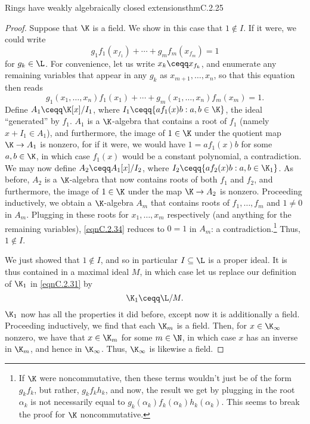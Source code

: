 \begin{thm}{Rings have weakly algebraically closed extensions}{thmC.2.25}
\begin{proof}
		Suppose that $\K$ is a field.  We show in this case that $1\notin I$.  If it were, we could write
		\begin{equation}
			g_1f_1(x_{f_1})+\cdots +g_mf_m(x_{f_m})=1
		\end{equation}
		for $g_k\in \L$.  For convenience, let us write $x_k\ceqq x_{f_k}$, and enumerate any remaining variables that appear in any $g_k$ as $x_{m+1},\ldots ,x_n$, so that this equation then reads
		\begin{equation}\label{eqnC.2.34}
			g_1(x_1,\ldots ,x_n)f_1(x_1)+\cdots +g_m(x_1,\ldots ,x_n)f_m(x_m)=1.
		\end{equation}
		Define $A_1\ceqq \K [x]/I_1$, where $I_1\ceqq \{ af_1(x)b:a,b\in \K \}$, the ideal ``generated'' by $f_1$.  $A_1$ is a $\K$-algebra that contains a root of $f_1$ (namely $x+I_1\in A_1$), and furthermore, the image of $1\in \K$ under the quotient map $\K \rightarrow A_1$ is nonzero, for if it were, we would have $1=af_1(x)b$ for some $a,b\in \K$, in which case $f_1(x)$ would be a constant polynomial, a contradiction.  We may now define $A_2\ceqq A_1[x]/I_2$, where $I_2\ceqq \{ af_2(x)b:a,b\in \K _1\}$.  As before, $A_2$ is a $\K$-algebra that now contains roots of both $f_1$ and $f_2$, and furthermore, the image of $1\in \K$ under the map $\K \rightarrow A_2$ is nonzero.  Proceeding inductively, we obtain a $\K$-algebra $A_m$ that contains roots of $f_1,\ldots ,f_m$ and $1\neq 0$ in $A_m$.  Plugging in these roots for $x_1,\ldots ,x_m$ respectively (and anything for the remaining variables), \eqref{eqnC.2.34} reduces to $0=1$ in $A_m$:  a contradiction.\footnote{If $\K$ were noncommutative, then these terms wouldn't just be of the form $g_kf_k$, but rather, $g_kf_kh_k$, and now, the result we get by plugging in the root $\alpha _k$ is not necessarily equal to $g_k(\alpha _k)f_k(\alpha _k)h_k(\alpha _k)$.  This seems to break the proof for $\K$ noncommutative.}  Thus, $1\notin I$.
		
		We just showed that $1\notin I$, and so in particular $I\subseteq \L$ is a proper ideal.  It is thus contained in a maximal ideal $M$, in which case let us replace our definition of $\K _1$ in \eqref{eqnC.2.31} by
		\begin{equation}
			\K _1\ceqq \L /M.
		\end{equation}
		$\K _1$ now has all the properties it did before, except now it is additionally a field.  Proceeding inductively, we find that each $\K _m$ is a field.  Then, for $x\in \K _{\infty}$ nonzero, we have that $x\in \K _m$ for some $m\in \N$, in which case $x$ has an inverse in $\K _m$, and hence in $\K _{\infty}$.  Thus, $\K _{\infty}$ is likewise a field.
	\end{proof}
\end{thm}
